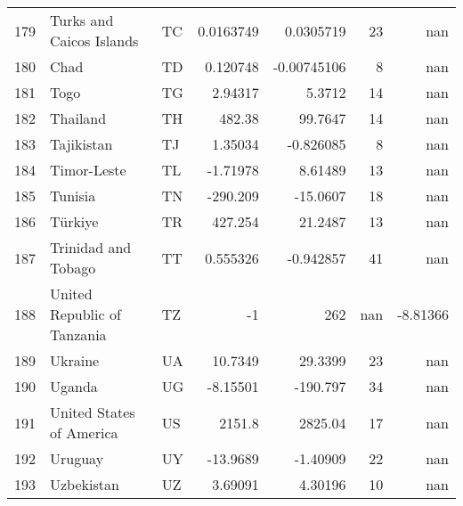 \begin{tabular}{rllrrrr}
 179 & Turks and Caicos Islands                                 & TC         &    0.0163749  &    0.0305719  &     23 &    nan       \\
 180 & Chad                                                     & TD         &    0.120748   &   -0.00745106 &      8 &    nan       \\
 181 & Togo                                                     & TG         &    2.94317    &    5.3712     &     14 &    nan       \\
 182 & Thailand                                                 & TH         &  482.38       &   99.7647     &     14 &    nan       \\
 183 & Tajikistan                                               & TJ         &    1.35034    &   -0.826085   &      8 &    nan       \\
 184 & Timor-Leste                                              & TL         &   -1.71978    &    8.61489    &     13 &    nan       \\
 185 & Tunisia                                                  & TN         & -290.209      &  -15.0607     &     18 &    nan       \\
 186 & Türkiye                                                  & TR         &  427.254      &   21.2487     &     13 &    nan       \\
 187 & Trinidad and Tobago                                      & TT         &    0.555326   &   -0.942857   &     41 &    nan       \\
 188 & United Republic of Tanzania                              & TZ         &   -1          &  262          &    nan &     -8.81366 \\
 189 & Ukraine                                                  & UA         &   10.7349     &   29.3399     &     23 &    nan       \\
 190 & Uganda                                                   & UG         &   -8.15501    & -190.797      &     34 &    nan       \\
 191 & United States of America                                 & US         & 2151.8        & 2825.04       &     17 &    nan       \\
 192 & Uruguay                                                  & UY         &  -13.9689     &   -1.40909    &     22 &    nan       \\
 193 & Uzbekistan                                               & UZ         &    3.69091    &    4.30196    &     10 &    nan       \\

\end{tabular}
